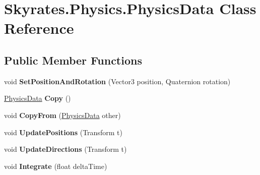 \hypertarget{class_skyrates_1_1_physics_1_1_physics_data}{\section{Skyrates.\-Physics.\-Physics\-Data Class Reference}
\label{class_skyrates_1_1_physics_1_1_physics_data}
}
\subsection*{Public Member Functions}
\begin{DoxyCompactItemize}
\item 
\hypertarget{class_skyrates_1_1_physics_1_1_physics_data_a854b10308d86826348ff29b34d084579}{void {\bfseries Set\-Position\-And\-Rotation} (Vector3 position, Quaternion rotation)}\label{class_skyrates_1_1_physics_1_1_physics_data_a854b10308d86826348ff29b34d084579}

\item 
\hypertarget{class_skyrates_1_1_physics_1_1_physics_data_adc5a6889fa3389405bfadea651c2800e}{\hyperlink{class_skyrates_1_1_physics_1_1_physics_data}{Physics\-Data} {\bfseries Copy} ()}\label{class_skyrates_1_1_physics_1_1_physics_data_adc5a6889fa3389405bfadea651c2800e}

\item 
\hypertarget{class_skyrates_1_1_physics_1_1_physics_data_a809e9c5cbb2f119076c61f6b82bfe655}{void {\bfseries Copy\-From} (\hyperlink{class_skyrates_1_1_physics_1_1_physics_data}{Physics\-Data} other)}\label{class_skyrates_1_1_physics_1_1_physics_data_a809e9c5cbb2f119076c61f6b82bfe655}

\item 
\hypertarget{class_skyrates_1_1_physics_1_1_physics_data_a71744f7ce8cd934ae59281661ab17a9e}{void {\bfseries Update\-Positions} (Transform t)}\label{class_skyrates_1_1_physics_1_1_physics_data_a71744f7ce8cd934ae59281661ab17a9e}

\item 
\hypertarget{class_skyrates_1_1_physics_1_1_physics_data_ae21ced9e055dcc36f2738a6fce1b884a}{void {\bfseries Update\-Directions} (Transform t)}\label{class_skyrates_1_1_physics_1_1_physics_data_ae21ced9e055dcc36f2738a6fce1b884a}

\item 
\hypertarget{class_skyrates_1_1_physics_1_1_physics_data_a1e2ef4902e764c2bb1081a9176b1805f}{void {\bfseries Integrate} (float delta\-Time)}\label{class_skyrates_1_1_physics_1_1_physics_data_a1e2ef4902e764c2bb1081a9176b1805f}

\end{DoxyCompactItemize}
